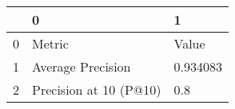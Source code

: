 \begin{tabular}{lll}
\toprule
{} &                       0 &         1 \\
\midrule
0 &                  Metric &     Value \\
1 &       Average Precision &  0.934083 \\
2 &  Precision at 10 (P@10) &       0.8 \\
\bottomrule
\end{tabular}

